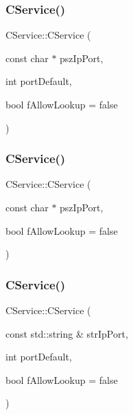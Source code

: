 \subsubsection{\texorpdfstring{C\+Service()}{CService()}\hspace{0.1cm}{\footnotesize\ttfamily [5/10]}}
{\footnotesize\ttfamily C\+Service\+::\+C\+Service (\begin{DoxyParamCaption}\item[{const char $\ast$}]{psz\+Ip\+Port,  }\item[{int}]{port\+Default,  }\item[{bool}]{f\+Allow\+Lookup = {\ttfamily false} }\end{DoxyParamCaption})\hspace{0.3cm}{\ttfamily [explicit]}}

\mbox{\label{class_c_service_ab8f5f4ae4e99a4edad8ba48642e36137}} 
\subsubsection{\texorpdfstring{C\+Service()}{CService()}\hspace{0.1cm}{\footnotesize\ttfamily [6/10]}}
{\footnotesize\ttfamily C\+Service\+::\+C\+Service (\begin{DoxyParamCaption}\item[{const char $\ast$}]{psz\+Ip\+Port,  }\item[{bool}]{f\+Allow\+Lookup = {\ttfamily false} }\end{DoxyParamCaption})\hspace{0.3cm}{\ttfamily [explicit]}}

\mbox{\label{class_c_service_a677f74b3520148f3e47a19bb9986922b}} 
\subsubsection{\texorpdfstring{C\+Service()}{CService()}\hspace{0.1cm}{\footnotesize\ttfamily [7/10]}}
{\footnotesize\ttfamily C\+Service\+::\+C\+Service (\begin{DoxyParamCaption}\item[{const std\+::string \&}]{str\+Ip\+Port,  }\item[{int}]{port\+Default,  }\item[{bool}]{f\+Allow\+Lookup = {\ttfamily false} }\end{DoxyParamCaption})\hspace{0.3cm}{\ttfamily [explicit]}}

